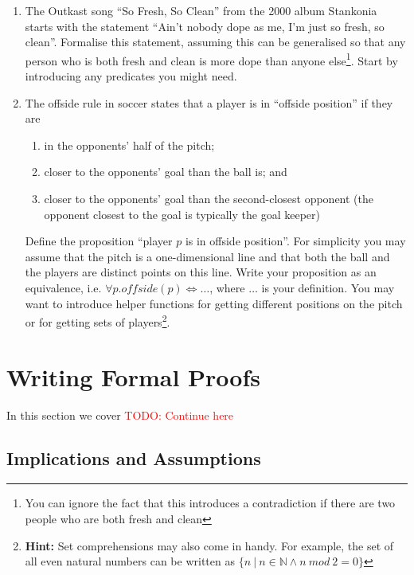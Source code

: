\documentclass{tufte-handout}
\newcounter{example}
\newcommand{\RED}[1]{\textcolor{red}{#1}}
\newcommand{\TODO}[1]{\RED{TODO: #1}}
\begin{document}
\begin{enumerate}
\item\label{freshclean} The Outkast song ``So Fresh, So Clean''
  from the 2000 album Stankonia starts with the statement ``Ain't
  nobody dope as me, I'm just so fresh, so clean''. Formalise this
  statement, assuming this can be generalised so that any person
  who is both fresh and clean is more dope than anyone
  else\footnote{You can ignore the fact that this introduces a
    contradiction if there are two people who are both fresh and
    clean}. Start by introducing any predicates you might need.
\item The offside rule in soccer states that a player is in
  ``offside position'' if they are
  \begin{enumerate}
  \item in the opponents' half of the pitch;
  \item closer to the opponents' goal than the ball is; and
  \item closer to the opponents' goal than the second-closest
    opponent (the opponent closest to the goal is typically the
    goal keeper)
  \end{enumerate}

  Define the proposition ``player $p$ is in offside position''.
  For simplicity you may assume that the pitch is a
  one-dimensional line and that both the ball and the players are
  distinct points on this line. Write your proposition as an
  equivalence, i.e. $\forall p. \mathit{offside}(p) \iff \dots$,
  where $\dots$ is your definition. You may want to introduce
  helper functions for getting different positions on the pitch or
  for getting sets of players\footnote{\textbf{Hint:} Set
    comprehensions may also come in handy. For example, the set of
    all even natural numbers can be written as
    $\{n ~|~ n \in \mathbb{N} \land n~mod~2 = 0\}$}.
\end{enumerate}

\section{Writing Formal Proofs}

In this section we cover \TODO{Continue here}

\subsection{Implications and Assumptions}
\end{document}
